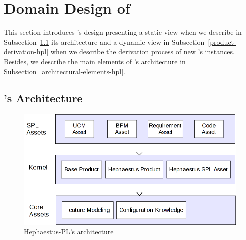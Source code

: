 \section{Domain Design of \hpl}
\label{sec:domainDesign}

This section introduces \hpl's design presenting a static view when we describe in Subsection~\ref{architectural-view-hpl} its architecture and a dynamic view in Subsection~\ref{product-derivation-hpl} when we describe the derivation process of new \hpl's instances. Besides, we describe the main elements of \hpl's architecture in  Subsection~\ref{architectural-elements-hpl}.


\subsection{\hpl's Architecture} \label{architectural-view-hpl}


%
%



\begin{figure}[bth]
\begin{center}
\includegraphics[scale=0.5]{imagens/architecture-hpl.png}
\end{center}
\caption{Hephaestus-PL's architecture}
\label{fig:architecture-hpl}
\end{figure}

